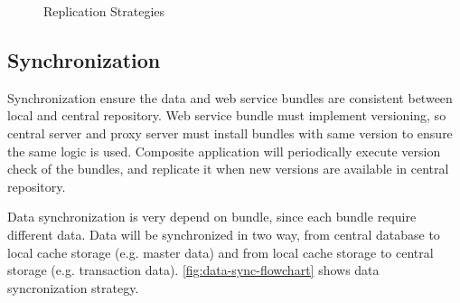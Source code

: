 \documentclass[conference]{IEEEtran}
\begin{document}
\begin{figure}
	\centering
	\hfil\hfil
	\caption{Replication Strategies}
	\label{fig:replication-flowchart}
\end{figure}




\subsection{Synchronization}
Synchronization ensure the data and web service bundles are consistent between local and central repository. Web service bundle must implement versioning, so central server and proxy server must install bundles with same version to ensure the same logic is used. Composite application will periodically execute version check of the bundles, and replicate it when new versions are available in central repository.

Data synchronization is very depend on bundle, since each bundle require different data. Data will be synchronized in two way, from central database to local cache storage (e.g. master data) and from local cache storage to central storage (e.g. transaction data). \figurename{\ref{fig:data-sync-flowchart}} shows data syncronization strategy.
\end{document}
